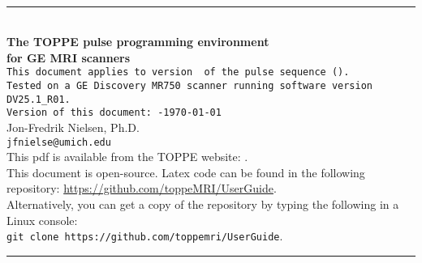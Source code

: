 

\begin{titlepage}
~\\[0.5in]
\begin{centering}
\rule{\textwidth}{5pt}
~\\[0.5in]
{\bf \huge The TOPPE pulse programming environment} \\ [0.4in]
{\bf \huge for GE MRI scanners} \\ [0.6in]
{\tt This document applies to version~\toppeversion~of the pulse sequence (\toppe).   } \\ [0.1in]
{\tt Tested on a GE Discovery MR750 scanner running software version DV25.1\_R01.   } \\ [0.6in]
{\tt Version of this document:~\toppeversion-\today} \\ [1in]
{\large Jon-Fredrik Nielsen, Ph.D.} \\ [0.1in]
{\tt jfnielse@umich.edu} \\ [1in]
This pdf is available from the TOPPE website: \toppeweb. \\ [0.25in]
This document is open-source. Latex code can be found in the following repository: \url{https://github.com/toppeMRI/UserGuide}. \\
Alternatively, you can get a copy of the repository by typing the following in a Linux console:\\
{\tt git clone https://github.com/toppemri/UserGuide}. \\ [0.1in]
\rule{\textwidth}{5pt}
\end{centering}
\end{titlepage}


